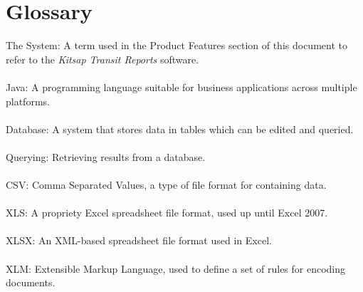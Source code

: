 \section{Glossary}
The System: A term used in the Product Features section of this document to refer to the \textit{Kitsap Transit Reports} software.\\\\
Java: A programming language suitable for business applications across multiple platforms.\\\\
Database: A system that stores data in tables which can be edited and queried.\\\\
Querying: Retrieving results from a database.\\\\
CSV: Comma Separated Values, a type of file format for containing data.\\\\
XLS: A propriety Excel spreadsheet file format, used up until Excel 2007.\\\\
XLSX: An XML-based spreadsheet file format used in Excel.\\\\
XLM: Extensible Markup Language, used to define a set of rules for encoding documents.